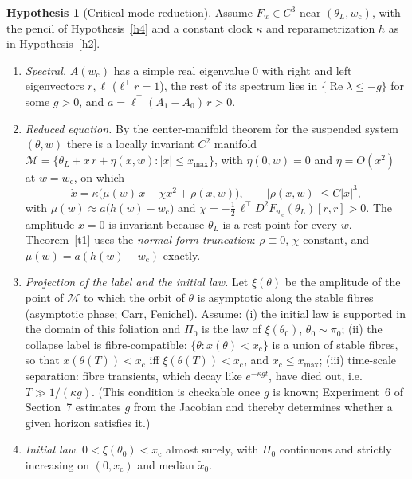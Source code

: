 \documentclass[11pt]{article}
\theoremstyle{definition}
\newtheorem{hyp}{Hypothesis}
\theoremstyle{remark}
\newcommand{\wcrit}{w_{\mathrm c}}
\newcommand{\xc}{x_{\mathrm c}}
\newcommand{\xmed}{\tilde x_0}
\begin{document}
\begin{hyp}[Critical-mode reduction]\label{h3}
Assume $F_w\in C^3$ near $(\theta_L,\wcrit)$, with the pencil of Hypothesis~\ref{h4} and a constant clock $\kappa$ and reparametrization $h$ as in Hypothesis~\ref{h2}.
\begin{enumerate}[label=(\alph*)]
\item \emph{Spectral.} $A(\wcrit)$ has a simple real eigenvalue $0$ with right and left eigenvectors $r,\ell$ ($\ell^\top r=1$), the rest of its spectrum lies in $\{\operatorname{Re}\lambda\le-g\}$ for some $g>0$, and $a=\ell^\top(A_1-A_0)\,r>0$.
\item \emph{Reduced equation.} By the center-manifold theorem for the suspended system $(\theta,w)$ there is a locally invariant $C^2$ manifold $\mathcal M=\{\theta_L+x\,r+\eta(x,w):|x|\le x_{\max}\}$, with $\eta(0,w)=0$ and $\eta=O(x^2)$ at $w=\wcrit$, on which
\[
\dot x=\kappa\big(\mu(w)\,x-\chi x^2+\rho(x,w)\big),\qquad |\rho(x,w)|\le C|x|^3,
\]
with $\mu(w)\approx a\big(h(w)-\wcrit\big)$ and $\chi=-\tfrac12\,\ell^\top D^2F_{\wcrit}(\theta_L)[r,r]>0$.
The amplitude $x=0$ is invariant because $\theta_L$ is a rest point for every $w$. Theorem~\ref{t1} uses the \emph{normal-form truncation}: $\rho\equiv0$, $\chi$ constant, and $\mu(w)=a(h(w)-\wcrit)$ exactly.
\item \emph{Projection of the label and the initial law.} Let $\xi(\theta)$ be the amplitude of the point of $\mathcal M$ to which the orbit of $\theta$ is asymptotic along the stable fibres (asymptotic phase; Carr, Fenichel). Assume: (i) the initial law is supported in the domain of this foliation and $\Pi_0$ is the law of $\xi(\theta_0)$, $\theta_0\sim\pi_0$; (ii) the collapse label is fibre-compatible: $\{\theta:x(\theta)<\xc\}$ is a union of stable fibres, so that $x(\theta(T))<\xc$ iff $\xi(\theta(T))<\xc$, and $\xc\le x_{\max}$; (iii) time-scale separation: fibre transients, which decay like $e^{-\kappa g t}$, have died out, i.e.\ $T\gg1/(\kappa g)$. (This condition is checkable once $g$ is known; Experiment~6 of Section~7 estimates $g$ from the Jacobian and thereby determines whether a given horizon satisfies it.)
\item \emph{Initial law.} $0<\xi(\theta_0)<\xc$ almost surely, with $\Pi_0$ continuous and strictly increasing on $(0,\xc)$ and median $\xmed$.
\end{enumerate}
\end{hyp}
\end{document}

